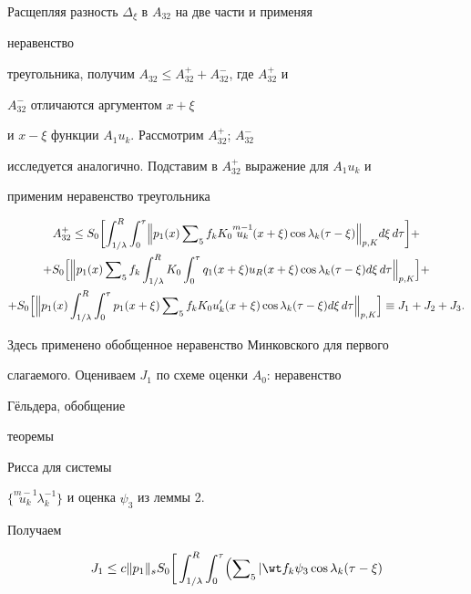 {Расщепляя разность $\Delta_\xi$ в $A_{32}$ на две части и применяя


неравенство


треугольника, получим $A_{32}\le A^+_{32}+A^-_{32}$, где $A^+_{32}$ и


$A^-_{32}$ отличаются аргументом $x+\xi$


и $x-\xi$ функции $A_1u_k$. Рассмотрим $A^+_{32}$;\; $A^-_{32}$


исследуется аналогично. Подставим в $A^+_{32}$ выражение для $A_1u_k$ и


применим неравенство треугольника


\begin{multline}


A^+_{32}\le S_0\biggl[\int^R_{1/\lambda}\int^\tau_0\Bigl\|


p_1(x)\sumn_5 f_k K_0\overset{m-1}{u_k}{}(x+\xi)\cos\lambda_k


(\tau-\xi)\Bigr\|_{p,K}d\xi\,d\tau\biggr]+\\


+S_0\Bigl[\Bigr\|p_1(x)\sumn_5 f_k\int^R_{1/\lambda}K_0


\int^\tau_0 q_1(x+\xi)u_R(x+\xi)\cos\lambda_k(\tau-\xi)


d\xi\,d\tau\Bigr\|_{p,K}\Bigr]+\\


+ S_0\Bigl[\Bigl\|p_1(x)\int^R_{1/\lambda}\int^\tau_0


p_1(x+\xi)\sumn_5 f_k K_0u'_k(x+\xi)\cos\lambda_k(\tau-\xi)


d\xi\,d\tau\Bigr\|_{p,K}\Bigr]\equiv J_1+J_2+J_3.


\end{multline}


Здесь применено обобщенное неравенство Минковского для первого


слагаемого. Оцениваем $J_1$ по схеме оценки $A_0$: неравенство


Г\"ельдера, обобщение


теоремы


Рисса для системы


$\{\overset{m-1}{u_k}{}\lambda^{-1}_k\}$ и оценка $\psi_3$ из леммы 2.


Получаем


\begin{multline*}


J_1\le c\|p_1\|_s S_0\biggl[\,\int^R_{1/\lambda}


\int^\tau_0\Bigl(\sumn_5|\wt f_k\psi_3\cos\lambda_k(\tau-\xi)



\end{multline*}}
